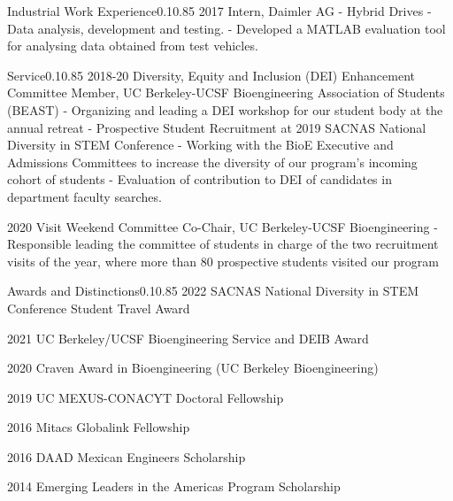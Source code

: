 \documentclass{federico_cv}
\begin{document}
\begin{tblSection}{Industrial Work Experience}{0.1}{0.85}
\leftbfrightsingle
{2017}
{Intern, Daimler AG}
{- Hybrid Drives - Data analysis, development and testing.}
{- Developed a MATLAB evaluation tool for analysing data obtained from test vehicles.}

\end{tblSection}


\begin{tblSection}{Service}{0.1}{0.85}
\leftbfrightsingle
{2018-20}
{Diversity, Equity and Inclusion (DEI) Enhancement Committee Member, UC Berkeley-UCSF Bioengineering Association of Students (BEAST)}
{- Organizing and leading a DEI workshop for our student body at the annual retreat}
{- Prospective Student Recruitment at 2019 SACNAS National Diversity in STEM Conference}
{- Working with the BioE Executive and Admissions Committees to increase the diversity of our program's incoming cohort of students}
{- Evaluation of contribution to DEI of candidates in department faculty searches.}

\leftbfrightsingle
{2020}
{Visit Weekend Committee Co-Chair, UC Berkeley-UCSF Bioengineering}
{- Responsible leading the committee of students in charge of the two recruitment visits of the year, where more than 80 prospective students visited our program}

\end{tblSection}


\begin{tblSection}{Awards and Distinctions}{0.1}{0.85}
\award
{2022}
{SACNAS National Diversity in STEM Conference Student Travel Award}

\award
{2021}
{UC Berkeley/UCSF Bioengineering Service and DEIB Award}

\award
{2020}
{Craven Award in Bioengineering (UC Berkeley Bioengineering)}

\award
{2019}
{UC MEXUS-CONACYT Doctoral Fellowship}

\award
{2016}
{Mitacs Globalink Fellowship}

\award
{2016}
{DAAD Mexican Engineers Scholarship}

\award
{2014}
{Emerging Leaders in the Americas Program Scholarship}

\end{tblSection}
\end{document}

